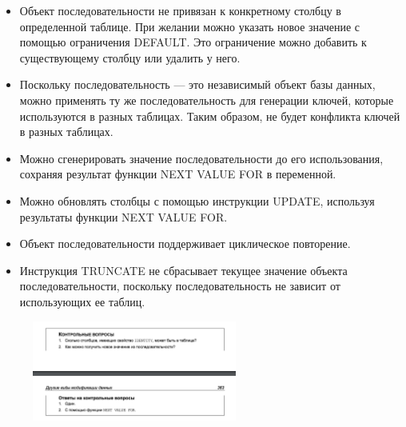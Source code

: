 \begin{itemize}
	\item Объект последовательности не привязан к конкретному столбцу в определенной
	таблице. При желании можно указать новое значение с помощью ограничения
	DEFAULT. Это ограничение можно добавить к существующему столбцу или удалить у него. 
	\item Поскольку последовательность — это независимый объект базы данных, можно
	применять ту же последовательность для генерации ключей, которые используются в разных таблицах. Таким образом, не будет конфликта ключей в разных
	таблицах. 
	\item Можно сгенерировать значение последовательности до его использования, сохраняя результат функции NEXT VALUE FOR в переменной. 
	\item Можно обновлять столбцы с помощью инструкции UPDATE, используя результаты функции NEXT VALUE FOR. 
	\item Объект последовательности поддерживает циклическое повторение. 
	\item Инструкция TRUNCATE не сбрасывает текущее значение объекта последовательности, поскольку последовательность не зависит от использующих ее таблиц. 
\end{itemize}

\begin{figure}[h!]
	\begin{center}
		\includegraphics[width=0.6\textwidth]{img/control24.png}
	\end{center}
	\captionsetup{justification=centering}
\end{figure}


